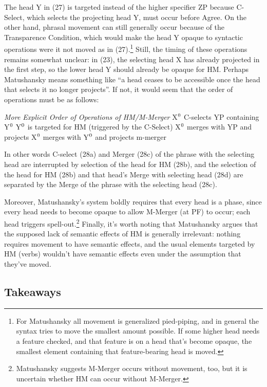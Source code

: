 \documentclass[]{ling-200b-2}
\newcommand*{\textsup}[1]{\ensuremath{^\textrm{{\scriptsize #1}}}}
\begin{document}
The head Y in (27) is targeted instead of the higher specifier ZP because C-Select, which selects the projecting head Y, must occur before Agree. On the other hand, phrasal movement can still generally occur because of the Transparence Condition, which would make the head Y opaque to syntactic operations were it not moved as in (27).\footnote{ For Matushansky all movement is generalized pied-piping, and in general the syntax tries to move the smallest amount possible. If some higher head needs a feature checked, and that feature is on a head that's become opaque, the smallest element containing that feature-bearing head is moved.} Still, the timing of these operations remains somewhat unclear: in (23), the selecting head X has already projected in the first step, so the lower head Y should already be opaque for HM. Perhaps Matushansky means something like ``a head ceases to be accessible once the head that selects it no longer projects''. If not, it would seem that the order of operations must be as follows: 

\pex \textit{More Explicit Order of Operations of HM/M-Merger}
\a X\textsup{0} C-selects YP containing Y\textsup{0}
\a Y\textsup{0} is targeted for HM (triggered by the C-Select)
\a X\textsup{0} merges with YP and projects
\a X\textsup{0} merges with Y\textsup{0} and projects
\a m-merger
\xe

\noindent In other words C-select (28a) and Merger (28c) of the phrase with the selecting head are interrupted by selection of the head for HM (28b), and the selection of the head for HM (28b) and that head's Merge with selecting head (28d) are separated by the Merge of the phrase with the selecting head (28c).

Moreover, Matushansky's system boldly requires that every head is a phase, since every head needs to become opaque to allow M-Merger (at PF) to occur; each head triggers spell-out.\footnote{ Matushansky suggests M-Merger occurs without movement, too, but it is uncertain whether HM can occur without M-Merger.} Finally, it's worth noting that Matushansky argues that the supposed lack of semantic effects of HM is generally irrelevant: nothing requires movement to have semantic effects, and the usual elements targeted by HM (verbs) wouldn't have semantic effects even under the assumption that they've moved.


\subsection{Takeaways}
\end{document}
